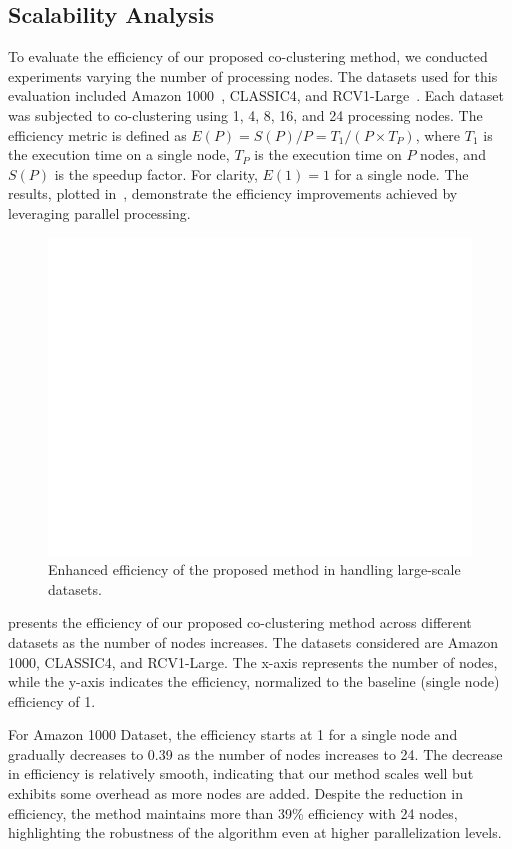 \documentclass[journal]{IEEEtran}
\renewcommand{\cite}[1]{~\autocite{#1}}
\begin{document}
\subsection{Scalability Analysis}
\label{subsec:scalability-analysis}
To evaluate the efficiency of our proposed co-clustering method, we conducted experiments varying the number of processing nodes. The datasets used for this evaluation included Amazon 1000\cite{ni2019JustifyingRecommendationsUsing}, CLASSIC4, and RCV1-Large\cite{lewis2004Rcv1NewBenchmark}. Each dataset was subjected to co-clustering using 1, 4, 8, 16, and 24 processing nodes. {\color{blue}The efficiency metric is defined as $E(P) = S(P)/P = T_1/(P \times T_P)$, where $T_1$ is the execution time on a single node, $T_P$ is the execution time on $P$ nodes, and $S(P)$ is the speedup factor. For clarity, $E(1) = 1$ for a single node.} The results, plotted in~, demonstrate the efficiency improvements achieved by leveraging parallel processing.

\begin{figure}[htbp]
    \centering
    \includegraphics[width=0.8\linewidth]{efficiency.png}
    \caption{Enhanced efficiency of the proposed method in handling large-scale datasets.}
    \label{fig:efficiency}
\end{figure}

 presents the efficiency of our proposed co-clustering method across different datasets as the number of nodes increases. The datasets considered are Amazon 1000, CLASSIC4, and RCV1-Large. The x-axis represents the number of nodes, while the y-axis indicates the efficiency, normalized to the baseline (single node) efficiency of 1.

For Amazon 1000 Dataset, the efficiency starts at 1 for a single node and gradually decreases to 0.39 as the number of nodes increases to 24. The decrease in efficiency is relatively smooth, indicating that our method scales well but exhibits some overhead as more nodes are added. Despite the reduction in efficiency, the method maintains more than 39\% efficiency with 24 nodes, highlighting the robustness of the algorithm even at higher parallelization levels.
\end{document}

